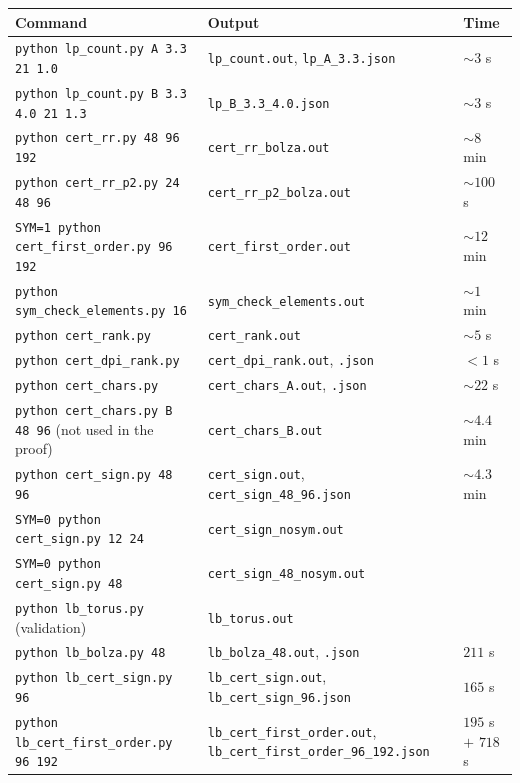 \documentclass[11pt]{amsart}
\theoremstyle{definition}
\theoremstyle{remark}
\begin{document}
\begin{center}
\small
\begin{tabular}{@{}p{}p{}p{}@{}}
\toprule
Command & Output & Time\\
\midrule
\texttt{python lp\_count.py A 3.3 21 1.0} & \texttt{lp\_count.out}, \texttt{lp\_A\_3.3.json} & $\sim3$ s\\
\texttt{python lp\_count.py B 3.3 4.0 21 1.3} & \texttt{lp\_B\_3.3\_4.0.json} & $\sim3$ s\\
\texttt{python cert\_rr.py 48 96 192} & \texttt{cert\_rr\_bolza.out} & $\sim8$ min\\
\texttt{python cert\_rr\_p2.py 24 48 96} & \texttt{cert\_rr\_p2\_bolza.out} & $\sim100$ s\\
\texttt{SYM=1 python cert\_first\_order.py 96 192} & \texttt{cert\_first\_order.out} & $\sim12$ min\\
\texttt{python sym\_check\_elements.py 16} & \texttt{sym\_check\_elements.out} & $\sim1$ min\\
\texttt{python cert\_rank.py} & \texttt{cert\_rank.out} & $\sim5$ s\\
\texttt{python cert\_dpi\_rank.py} & \texttt{cert\_dpi\_rank.out}, \texttt{.json} & $<1$ s\\
\texttt{python cert\_chars.py} & \texttt{cert\_chars\_A.out}, \texttt{.json} & $\sim22$ s\\
\texttt{python cert\_chars.py B 48 96} (not used in the proof) & \texttt{cert\_chars\_B.out} & $\sim4.4$ min\\
\texttt{python cert\_sign.py 48 96} & \texttt{cert\_sign.out}, \texttt{cert\_sign\_48\_96.json} & $\sim4.3$ min\\
\texttt{SYM=0 python cert\_sign.py 12 24} & \texttt{cert\_sign\_nosym.out} & \\
\texttt{SYM=0 python cert\_sign.py 48} & \texttt{cert\_sign\_48\_nosym.out} & \\
\texttt{python lb\_torus.py} (validation) & \texttt{lb\_torus.out} & \\
\texttt{python lb\_bolza.py 48} & \texttt{lb\_bolza\_48.out}, \texttt{.json} & $211$ s\\
\texttt{python lb\_cert\_sign.py 96} & \texttt{lb\_cert\_sign.out}, \texttt{lb\_cert\_sign\_96.json} & $165$ s\\
\texttt{python lb\_cert\_first\_order.py 96 192} & \texttt{lb\_cert\_first\_order.out}, \texttt{lb\_cert\_first\_order\_}\allowbreak\texttt{96\_192.json} & $195$ s $+$ $718$ s\\
\bottomrule
\end{tabular}
\end{center}
\end{document}
